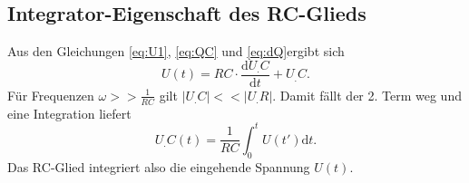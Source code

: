 \subsection{Integrator-Eigenschaft des RC-Glieds}
Aus den Gleichungen \eqref{eq:U1}, \eqref{eq:QC} und \eqref{eq:dQ}ergibt sich
\[
U(t)=RC\cdot\frac{\mathrm{d}U_.C}{\mathrm{d}t} + U_.C\text{.}
\]
Für Frequenzen $\omega >> \frac{1}{RC}$ gilt $|U_.C| << |U_.R|$. Damit fällt der 2. Term weg und eine Integration liefert
\[
U_.C(t)=\frac{1}{RC}\int_0^tU(t')\mathrm{d}t\text{.}
\]
Das RC-Glied integriert also die eingehende Spannung $U(t)$.